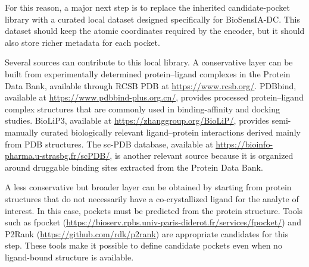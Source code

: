 \documentclass[12pt,fleqn]{article}
\begin{document}

For this reason, a major next step is to replace the inherited
candidate-pocket library with a curated local dataset designed
specifically for BioSensIA-DC. This dataset should keep the atomic
coordinates required by the encoder, but it should also store richer
metadata for each pocket.


Several sources can contribute to this local library. A conservative
layer can be built from experimentally determined protein--ligand
complexes in the Protein Data Bank, available through RCSB PDB at
\url{https://www.rcsb.org/}. PDBbind, available at
\url{https://www.pdbbind-plus.org.cn/}, provides processed
protein--ligand complex structures that are commonly used in
binding-affinity and docking studies. BioLiP3, available at
\url{https://zhanggroup.org/BioLiP/}, provides semi-manually curated
biologically relevant ligand--protein interactions derived mainly from
PDB structures. The sc-PDB database, available at
\url{https://bioinfo-pharma.u-strasbg.fr/scPDB/}, is another relevant
source because it is organized around druggable binding sites
extracted from the Protein Data Bank.


A less conservative but broader layer can be obtained by starting from
protein structures that do not necessarily have a co-crystallized
ligand for the analyte of interest. In this case, pockets must be
predicted from the protein structure. Tools such as fpocket
(\url{https://bioserv.rpbs.univ-paris-diderot.fr/services/fpocket/})
and P2Rank (\url{https://github.com/rdk/p2rank}) are appropriate
candidates for this step. These tools make it possible to define
candidate pockets even when no ligand-bound structure is available.
\end{document}
